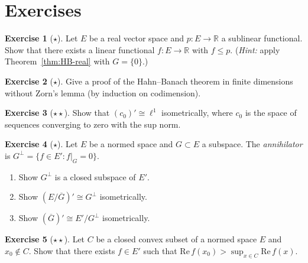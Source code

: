 \documentclass[a4paper,12pt]{book}
\newcommand{\R}{\mathbb{R}}
\theoremstyle{definition}
\newtheorem{exercise}{Exercise}[chapter]
\theoremstyle{plain}
\theoremstyle{remark}
\begin{document}
\section{Exercises}

\begin{exercise}[$\star$]\label{exo:HB-dominated}
Let $E$ be a real vector space and $p\colon E\to\R$ a sublinear functional.
Show that there exists a linear functional $f\colon E\to\R$ with $f\leq p$.
(\emph{Hint:} apply Theorem~\ref{thm:HB-real} with $G=\{0\}$.)
\end{exercise}

\begin{exercise}[$\star$]\label{exo:HB-finite-dim}
Give a proof of the Hahn--Banach theorem in finite dimensions without Zorn's
lemma (by induction on codimension).
\end{exercise}

\begin{exercise}[$\star\star$]\label{exo:dual-c0}
Show that $(c_0)'\cong\ell^1$ isometrically, where $c_0$ is the space of
sequences converging to zero with the sup norm.
\end{exercise}

\begin{exercise}[$\star$]\label{exo:annihilator-props}
Let $E$ be a normed space and $G\subset E$ a subspace. The \emph{annihilator}
is $G^\perp = \{f\in E' : f|_G=0\}$.
\begin{enumerate}[label=(\alph*)]
  \item Show $G^\perp$ is a closed subspace of $E'$.
  \item Show $(E/\overline{G})' \cong G^\perp$ isometrically.
  \item Show $(\overline{G})' \cong E'/G^\perp$ isometrically.
\end{enumerate}
\end{exercise}

\begin{exercise}[$\star\star$]\label{exo:separation-exercise}
Let $C$ be a closed convex subset of a normed space $E$ and $x_0\notin C$.
Show that there exists $f\in E'$ such that
$\mathrm{Re}\,f(x_0) > \sup_{x\in C}\mathrm{Re}\,f(x)$.
\end{exercise}
\end{document}
